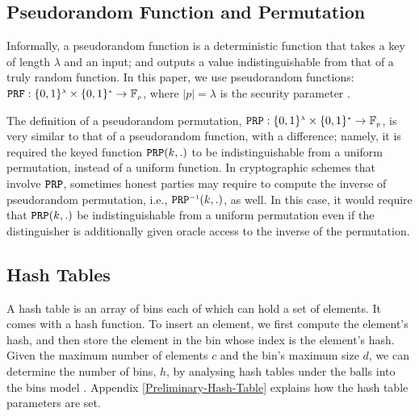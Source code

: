 %

\vs
\vs
\subsection{Pseudorandom Function and Permutation}


Informally, a pseudorandom function is a deterministic function that takes a key of length $\lambda$ and an input; and outputs a value  indistinguishable from that of  a truly random function.  In this paper, we use pseudorandom functions:   $\mathtt {PRF}: \{0,1\}^{\scriptscriptstyle \lambda}\times \{0,1\}^{\scriptscriptstyle *} \rightarrow  \mathbb{F}_{\scriptscriptstyle p}$, where $|p|=\lambda$ is the security parameter \cite{DBLP:books/crc/KatzLindell2007}. 


The definition of a pseudorandom permutation, $\mathtt {PRP}: \{0,1\}^{\scriptscriptstyle \lambda}\times \{0,1\}^{\scriptscriptstyle *} \rightarrow  \mathbb{F}_{\scriptscriptstyle p}$, is very similar to that of a pseudorandom function, with a difference; namely, it is required the keyed function $\mathtt{PRP}(k,.)$ to be indistinguishable from a uniform permutation, instead of a uniform function. In cryptographic schemes that involve $\mathtt{PRP}$, sometimes honest parties may require to compute the inverse of pseudorandom permutation, i.e., $\mathtt {PRP}^{\scriptscriptstyle -1}(k, .)$, as well. In this case, it would require that $\mathtt{PRP}(k,.)$ be indistinguishable from a uniform permutation even if the distinguisher is additionally given oracle access to the inverse of the permutation. 


\vs



\vs
\vs
\subsection{Hash Tables}
A hash table is an array of   bins each of which can hold a set of elements. It comes with a hash function. To insert an element, we first compute the element's hash,  and then store the element in the bin whose index is the element's hash. Given the maximum number of elements $c$ and the bin's maximum size $d$, we can determine the number of bins, $h$, by analysing hash tables under the balls into the bins model  \cite{DBLP:conf/stoc/BerenbrinkCSV00}. Appendix \ref{Preliminary-Hash-Table} explains how the hash table parameters are set.

